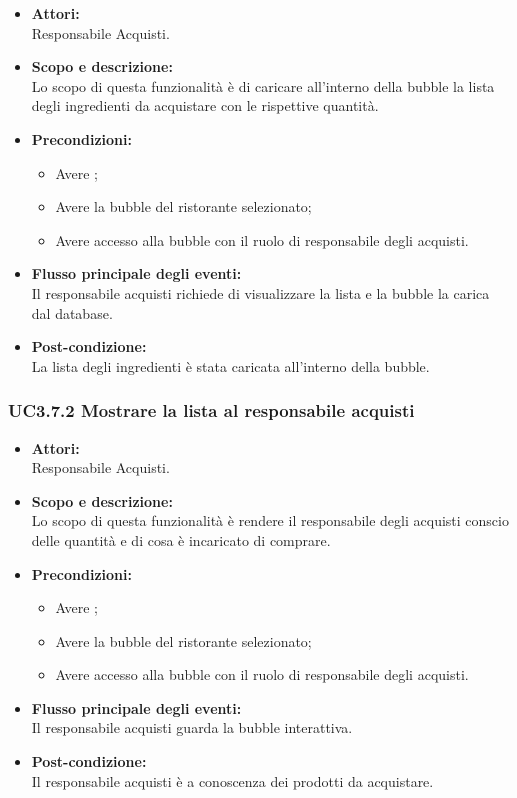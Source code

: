 \begin{itemize}
	\item \textbf{Attori:}
	\\Responsabile Acquisti.
	\item \textbf{Scopo e descrizione:} 
	\\Lo scopo di questa funzionalità è di caricare all’interno della bubble la lista degli ingredienti da acquistare con le rispettive quantità.
	\item \textbf{Precondizioni:}
	\begin{itemize}
		\item Avere ;
		\item Avere la bubble del ristorante selezionato;
		\item Avere accesso alla bubble con il ruolo di responsabile degli acquisti.
	\end{itemize}
	\item \textbf{Flusso principale degli eventi:}
	\\Il responsabile acquisti richiede di visualizzare la lista e la bubble la carica dal database.
	\item \textbf{Post-condizione:}
	\\La lista degli ingredienti è stata caricata all’interno della bubble.
\end{itemize}

\subsubsection{UC3.7.2 Mostrare la lista al responsabile acquisti} \label{UC3.7.2}

\begin{itemize}
	\item \textbf{Attori:}
	\\Responsabile Acquisti.
	\item \textbf{Scopo e descrizione:} 
	\\Lo scopo di questa funzionalità è rendere il responsabile degli acquisti conscio delle quantità e di cosa è incaricato di comprare.
	\item \textbf{Precondizioni:}
	\begin{itemize}
		\item Avere ;
		\item Avere la bubble del ristorante selezionato;
		\item Avere accesso alla bubble con il ruolo di responsabile degli acquisti.
	\end{itemize}
	\item \textbf{Flusso principale degli eventi:}
	\\Il responsabile acquisti guarda la bubble interattiva.
	\item \textbf{Post-condizione:}
	\\Il responsabile acquisti è a conoscenza dei prodotti da acquistare.
\end{itemize}

